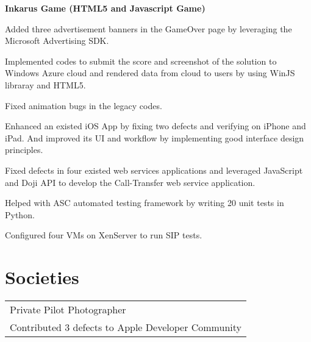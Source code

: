 \documentclass[letterpaper]{lyu-resume} %
\begin{document}
\begin{minipage}[t]{0.66\textwidth}
\vspace{2 mm}
\textbf{Inkarus Game (HTML5 and Javascript Game)}
\begin{tightitemize}
\item Added three advertisement banners in the GameOver page by leveraging the Microsoft Advertising SDK.
\item Implemented codes to submit the score and screenshot of the solution to Windows Azure cloud and rendered data from cloud to users by using WinJS libraray and HTML5.
\item Fixed animation bugs in the legacy codes.
\end{tightitemize}

\sectionspace %



\begin{tightitemize}
\item Enhanced an existed iOS App by fixing two defects and verifying on iPhone and iPad. And improved its UI and workflow by implementing good interface design principles.
\item Fixed defects in four existed web services applications and leveraged JavaScript and Doji API to develop the Call-Transfer web service application. 
\item Helped with ASC automated testing framework by writing 20 unit tests in Python.
\item Configured four VMs on XenServer to run SIP tests.
\end{tightitemize}

\sectionspace %


\section{Societies} 

\begin{tabular}{l}

\textbullet{} Private Pilot \textbullet{} Photographer \\
\textbullet{} Contributed 3 defects to Apple Developer Community
\end{tabular}

\sectionspace %


\end{minipage} %
\end{document}
